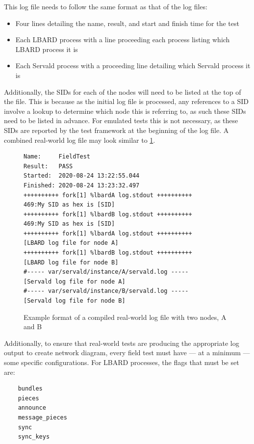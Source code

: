 This log file needs to follow the same format as that of the log files:
\begin{itemize}
    \item Four lines detailing the name, result, and start and finish time for the test
    \item Each LBARD process with a line proceeding each process listing which LBARD process it is
    \item Each Servald process with a proceeding line detailing which Servald process it is
\end{itemize} 

Additionally, the SIDs for each of the nodes will need to be listed at the top of the file. 
This is because as the initial log file is processed, any references to a SID involve a lookup to determine which node this is referring to, as such these SIDs need to be listed in advance.
For emulated tests this is not necessary, as these SIDs are reported by the test framework at the beginning of the log file.
A combined real-world log file may look similar to \figurename{ \ref{fig:chapter6RealWorldLog}}.

\begin{figure}
    \begin{centering}
\begin{lstlisting}[basicstyle=\small, breaklines, frame=single]
Name:     FieldTest
Result:   PASS
Started:  2020-08-24 13:22:55.044
Finished: 2020-08-24 13:23:32.497
++++++++++ fork[1] %lbardA log.stdout ++++++++++
469:My SID as hex is [SID]
++++++++++ fork[1] %lbardB log.stdout ++++++++++
469:My SID as hex is [SID]
++++++++++ fork[1] %lbardA log.stdout ++++++++++
[LBARD log file for node A]
++++++++++ fork[1] %lbardB log.stdout ++++++++++
[LBARD log file for node B]
#----- var/servald/instance/A/servald.log -----
[Servald log file for node A]
#----- var/servald/instance/B/servald.log -----
[Servald log file for node B]
\end{lstlisting}
        \caption{Example format of a compiled real-world log file with two nodes, A and B}
        \label{fig:chapter6RealWorldLog}
    \end{centering}
\end{figure}

Additionally, to ensure that real-world tests are producing the appropriate log output to create network diagram, every field test must have — at a minimum — some specific configurations.
For LBARD processes, the flags that must be set are:
\begin{lstlisting}
    bundles
    pieces
    announce
    message_pieces
    sync
    sync_keys
    \end{lstlisting}

